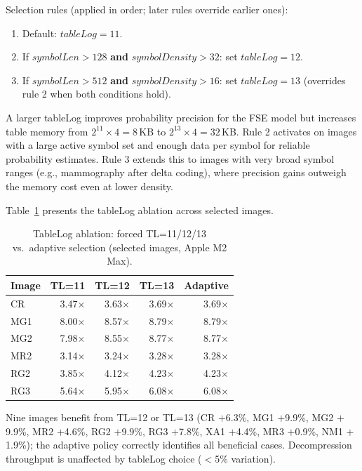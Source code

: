 \documentclass[journal]{IEEEtran}
\begin{document}
Selection rules (applied in order; later rules override earlier ones):
\begin{enumerate}
  \item Default: $\textit{tableLog} = 11$.
  \item If $\textit{symbolLen} > 128$ \textbf{and} $\textit{symbolDensity} > 32$:
  set $\textit{tableLog} = 12$.
  \item If $\textit{symbolLen} > 512$ \textbf{and} $\textit{symbolDensity} > 16$:
  set $\textit{tableLog} = 13$ (overrides rule 2 when both conditions hold).
\end{enumerate}

A larger tableLog improves probability precision for the FSE model but
increases table memory from $2^{11} \times 4 = 8$\,KB to $2^{13} \times 4 =
32$\,KB. Rule 2 activates on images with a large active symbol set and enough
data per symbol for reliable probability estimates. Rule 3 extends this to
images with very broad symbol ranges (e.g., mammography after delta coding),
where precision gains outweigh the memory cost even at lower density.

Table~\ref{tab:tablelog-ablation} presents the tableLog ablation across
selected images.

\begin{table}[htbp]
\centering
\caption{TableLog ablation: forced TL=11/12/13 vs.\ adaptive selection
(selected images, Apple M2 Max).}
\label{tab:tablelog-ablation}
\scriptsize
\begin{tabular}{lrrrr}
\toprule
Image & TL=11 & TL=12 & TL=13 & Adaptive \\
\midrule
CR  & 3.47$\times$ & 3.63$\times$ & 3.69$\times$ & 3.69$\times$ \\
MG1 & 8.00$\times$ & 8.57$\times$ & 8.79$\times$ & 8.79$\times$ \\
MG2 & 7.98$\times$ & 8.55$\times$ & 8.77$\times$ & 8.77$\times$ \\
MR2 & 3.14$\times$ & 3.24$\times$ & 3.28$\times$ & 3.28$\times$ \\
RG2 & 3.85$\times$ & 4.12$\times$ & 4.23$\times$ & 4.23$\times$ \\
RG3 & 5.64$\times$ & 5.95$\times$ & 6.08$\times$ & 6.08$\times$ \\
\bottomrule
\end{tabular}
\end{table}

Nine images benefit from TL=12 or TL=13 (CR $+$6.3\%, MG1 $+$9.9\%, MG2
$+$9.9\%, MR2 $+$4.6\%, RG2 $+$9.9\%, RG3 $+$7.8\%, XA1 $+$4.4\%, MR3
$+$0.9\%, NM1 $+$1.9\%); the adaptive policy correctly identifies all
beneficial cases. Decompression throughput is unaffected by tableLog choice
($<$5\% variation).
\end{document}
